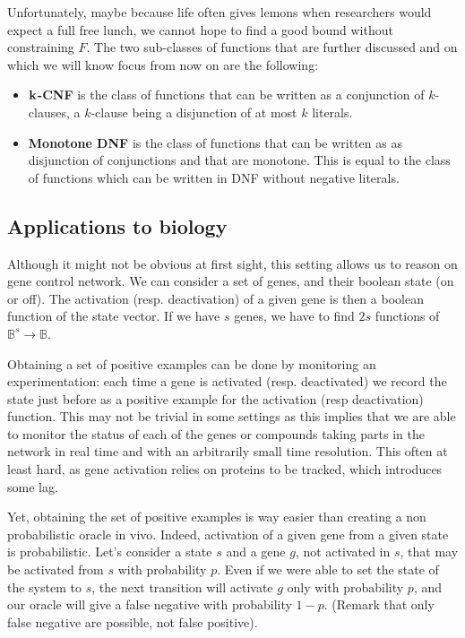 \documentclass[fontsize=9pt,enabledeprecatedfontcommands]{scrartcl}
\begin{document}
Unfortunately, maybe because life often gives lemons when researchers would expect a full free lunch, we cannot hope to find a good bound without constraining $F$. The two sub-classes of functions that are further discussed and on which we will know focus from now on are the following:
\begin{itemize}
	\item \textbf{$\bf k$-CNF} is the class of functions that can be written as a conjunction of $k$-clauses, a $k$-clause being a disjunction of at most $k$ literals. 
	\item \textbf{Monotone DNF} is the class of functions that can be written as as disjunction of conjunctions and that are monotone. This is equal to the class of functions which can be written in DNF without negative literals.
\end{itemize}
\subsection{Applications to biology}
Although it might not be obvious at first sight, this setting allows us to reason on gene control network. We can consider a set of genes, and their boolean state (on or off). The activation (resp. deactivation) of a given gene is then a boolean function of the state vector. If we have $s$ genes, we have to find $2s$ functions of $ \mathbb{B}^s \rightarrow \mathbb{B}$.

Obtaining a set of positive examples can be done by monitoring an experimentation: each time a gene is activated (resp. deactivated) we record the state just before as a positive example for the activation (resp deactivation) function. This may not be trivial in some settings as this implies that we are able to monitor the status of each of the genes or compounds taking parts in the network in real time and with an arbitrarily small time resolution. This often at least hard, as gene activation relies on proteins to be tracked, which introduces some lag.

Yet, obtaining the set of positive examples is way easier than creating a non probabilistic oracle in vivo. Indeed, activation of a given gene from a given state is probabilistic. Let's consider a state $s$ and a gene $g$, not activated in $s$, that may be activated from $s$ with probability $p$. Even if we were able to set the state of the system to $s$, the next transition will activate $g$ only with probability $p$, and our oracle will give a false negative with probability $1-p$. (Remark that only false negative are possible, not false positive).
\end{document}
